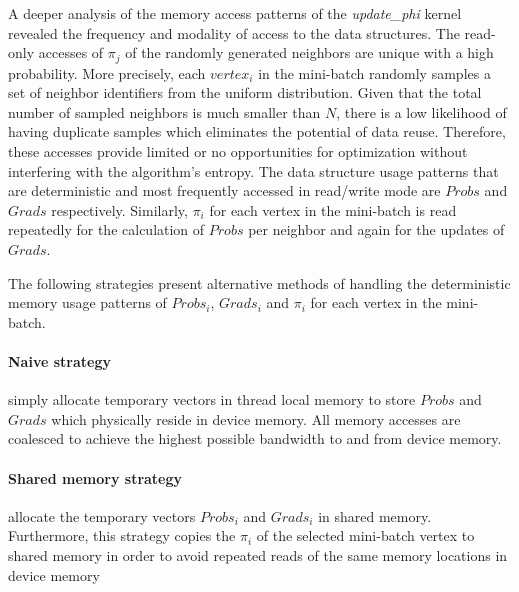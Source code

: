 A deeper analysis of the memory access patterns of the \textit{update\_phi} kernel
revealed the frequency and modality of access to the data structures.
%
The read-only accesses of $\pi_j$ of the randomly generated neighbors are unique
with a high probability. More precisely, each $vertex_i$ in the mini-batch
randomly samples a set of neighbor identifiers from the uniform distribution.
Given that the total number of sampled neighbors is much smaller than $N$,
there is a low likelihood of having duplicate samples which eliminates the
potential of data reuse. Therefore, these accesses provide limited or no
opportunities for optimization without interfering with the algorithm's
entropy.
%
The data structure usage patterns that are deterministic and most frequently
accessed in read/write mode are $Probs$ and $Grads$ respectively. Similarly,
$\pi_i$ for each vertex in the mini-batch is read repeatedly for the
calculation of $Probs$ per neighbor and again for the updates of $Grads$.

The following strategies present alternative methods of handling the
deterministic memory usage patterns of $Probs_i$, $Grads_i$ and $\pi_i$ for each
vertex in the mini-batch.

\paragraph*{\textbf{Naive strategy}} simply allocate temporary vectors in thread
local memory to store $Probs$ and $Grads$ which physically reside in
device memory. All memory accesses are coalesced to achieve the highest
possible bandwidth to and from device memory.

\paragraph*{\textbf{Shared memory strategy}} allocate the temporary vectors
$Probs_i$ and $Grads_i$
in shared memory. Furthermore, this strategy copies the $\pi_i$ of the selected
mini-batch vertex to shared memory in order to avoid repeated reads of the same
memory locations in device memory

